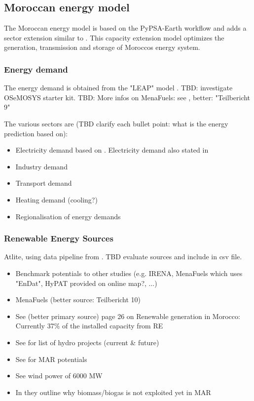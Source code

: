 \subsection{Moroccan energy model}
\label{subsec:moroccan_model}
The Moroccan energy model is based on the PyPSA-Earth workflow \cite{Parzen2022} and 
adds a sector extension similar to \cite{Brown2018a}.
This capacity extension model optimizes the generation, transmission and storage of Moroccos energy system.


\subsubsection{Energy demand}
The energy demand is obtained from the "LEAP" model \cite{Heaps2022}.
TBD: investigate OSeMOSYS starter kit.
TBD: More infos on MenaFuels: see \cite[p. 35]{Ersoy2022}, better: "Teilbericht 9"

The various sectors are (TBD clarify each bullet point: what is the energy prediction based on):
\begin{itemize}
    \item Electricity demand based on \cite{Parzen2022}. Electricity demand also stated in \cite[primary source 25]{Boulakhbar2020}
    \item Industry demand
    \item Transport demand
    \item Heating demand (cooling?) 
    \item Regionalisation of energy demands
\end{itemize}



\subsubsection{Renewable Energy Sources}
Atlite, using data pipeline from \cite{Parzen2022}. TBD evaluate sources and include in csv file.

\begin{itemize}
    \item Benchmark potentials to other studies (e.g. IRENA, MenaFuels which uses "EnDat", HyPAT provided on online map?, ...)
    \item MenaFuels \cite[p. 25]{Ersoy2022} (better source: Teilbericht 10)
    \item See \cite{Ersoy2022} (better primary source) page 26 on Renewable generation in Morocco: Currently 37\% of the installed capacity from RE
    \item See \cite[p. 5]{Boulakhbar2020} for list of hydro projects (current \& future)
    \item See \cite[primary 10,13,17]{Boulakhbar2020} for MAR potentials
    \item See \cite[primary 13, 38]{Boulakhbar2020} wind power of 6000 MW
    \item In \cite[p. 6]{Boulakhbar2020} they outline why biomass/biogas is not exploited yet in MAR
\end{itemize}


